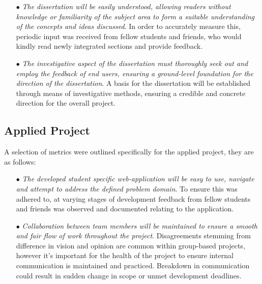 \begin{itemize}
  \item[$\bullet$] \textit{The dissertation will be easily understood, allowing readers without knowledge or familiarity of the subject area to form a suitable understanding of the concepts and ideas discussed}. In order to accurately measure this, periodic input was received from fellow students and friends, who would kindly read newly integrated sections and provide feedback.
\end{itemize}

\begin{itemize}
  \item[$\bullet$] \textit{The investigative aspect of the dissertation must thoroughly seek out and employ the feedback of end users, ensuring a ground-level foundation for the direction of the dissertation}. A basis for the dissertation will be established through means of investigative methods, ensuring a credible and concrete direction for the overall project. 
\end{itemize}

\subsection{Applied Project}
A selection of metrics were outlined specifically for the applied project, they are as follows: 

\begin{itemize}
  \item[$\bullet$] \textit{The developed student specific web-application will be easy to use, navigate and attempt to address the defined problem domain}. To ensure this was adhered to, at varying stages of development feedback from fellow students and friends was observed and documented relating to the application.
\end{itemize}

\begin{itemize}
  \item[$\bullet$] \textit{Collaboration between team members will be maintained to ensure a smooth and fair flow of work throughout the project}. Disagreements stemming from difference in vision and opinion are common within group-based projects, however it's important for the health of the project to ensure internal communication is maintained and practiced. Breakdown in communication could result in sudden change in scope or unmet development deadlines. 
\end{itemize}

